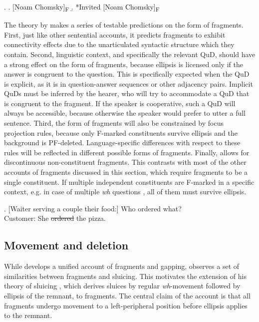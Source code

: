 \ex. \a. [Noam Chomsky]\textsubscript{F}
     \b. *Invited [Noam Chomsky]\textsubscript{F}

The theory by \citet{reich2007} makes a series of testable predictions on the form of fragments. First, just like other sentential accounts, it predicts fragments to exhibit connectivity effects due to the unarticulated syntactic structure which they contain. Second, linguistic context, and specifically the relevant QuD, should have a strong effect on the form of fragments, because ellipsis is licensed only if the answer is congruent to the question. This is specifically expected when the QuD is explicit, as it is in question-answer sequences or other adjacency pairs. Implicit QuDs must be inferred by the hearer, who will try to accommodate a QuD that is congruent to the fragment. If the speaker is cooperative, such a QuD will always be accessible, because otherwise the speaker would prefer to utter a full sentence. Third, the form of fragments will also be constrained by focus projection rules, because only F-marked constituents survive ellipsis and the background is PF-deleted. Language-specific differences with respect to these rules will be reflected in different possible forms of fragments. Finally, \citet{reich2007} allows for discontinuous non-constituent fragments. This contrasts with most of the other accounts of fragments discussed in this section, which require fragments to be a single constituent. If multiple independent constituents are F-marked in a specific context, e.g. in case of multiple \textit{wh} questions \Next, all of them must survive ellipsis.

\ex. [Waiter serving a couple their food:] Who ordered what?\\
Customer: She \sout{ordered} the pizza. \label{ex:theories-discontinuous-en-pizza}


\subsection{Movement and deletion} \label{sec:theories-movement}

While \citet{reich2007} develops a unified account of fragments and gapping, \citet{merchant2004} observes a set of similarities between fragments and sluicing. This motivates the extension of his theory of sluicing \citep{merchant2001}, which derives sluices by regular \textit{wh}-movement followed by ellipsis of the remnant, to fragments. The central claim of the account is that all fragments undergo movement to a left-peripheral position before ellipsis applies to the remnant.

